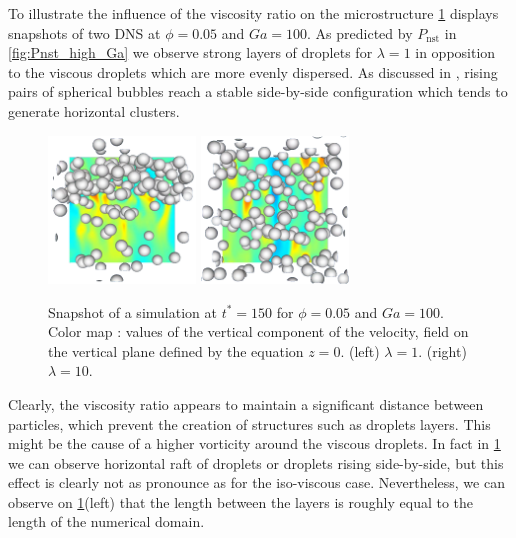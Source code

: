 To illustrate the influence of the viscosity ratio on the microstructure \ref{fig:images} displays snapshots of two DNS at $\phi = 0.05$ and $Ga = 100$. 
As predicted by $P_\text{nst}$ in \ref{fig:Pnst_high_Ga} we observe strong layers of droplets for $\lambda = 1$ in opposition to the viscous droplets which are more evenly dispersed. 
As discussed in \citet{zhang2021three}, rising pairs of spherical bubbles reach a stable side-by-side configuration which tends to generate horizontal clusters. 
\begin{figure}[h!]
    \centering
    \includegraphics[width=0.35\textwidth]{image/HOMOGENEOUS_NEW/P_PHI_5_l_10_Ga_100.png}
    \includegraphics[width=0.35\textwidth]{image/HOMOGENEOUS_NEW/P_PHI_5_l_1_Ga_100.png}
    \caption{Snapshot of a simulation at $t^* = 150$ for $\phi=0.05$ and $Ga=100$.
    Color map : values of the vertical component of the velocity, field on the vertical plane defined by the equation $z=0$. 
    (left)  $\lambda = 1$.
    (right)  $\lambda = 10$.
    }
    \label{fig:images}
\end{figure}
Clearly, the viscosity ratio appears to maintain a significant distance between particles, which prevent the creation of structures such as droplets layers.
This might be the cause of a higher vorticity around the viscous droplets.   
In fact in \ref{fig:images} we can observe horizontal raft of droplets or droplets rising side-by-side, but this effect is clearly not as pronounce as for the iso-viscous case. 
Nevertheless, we can observe on \ref{fig:images}(left) that the length between the layers is roughly equal to the length of the numerical domain. 
